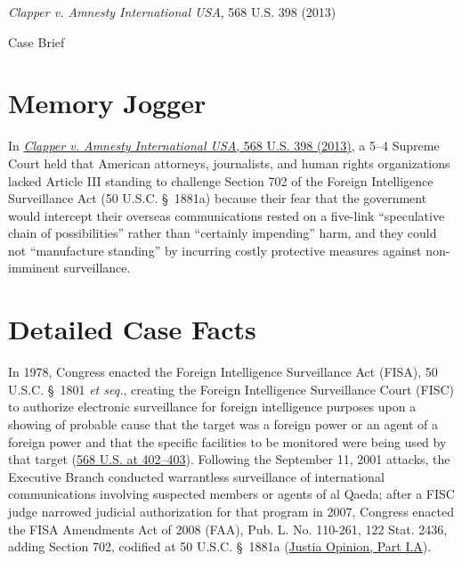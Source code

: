 \documentclass[12pt]{article}
\begin{document}
\begin{center}
{\LARGE \textit{Clapper v. Amnesty International USA}, 568 U.S. 398 (2013)\par}
\vspace{0.8em}
{\large Case Brief\par}
\end{center}
\vspace{1em}

\section{Memory Jogger}

In \href{https://supreme.justia.com/cases/federal/us/568/398/}{\textit{Clapper v. Amnesty International USA}, 568 U.S. 398 (2013)}, a 5--4 Supreme Court held that American attorneys, journalists, and human rights organizations lacked Article III standing to challenge Section 702 of the Foreign Intelligence Surveillance Act (50 U.S.C. \S~1881a) because their fear that the government would intercept their overseas communications rested on a five-link ``speculative chain of possibilities'' rather than ``certainly impending'' harm, and they could not ``manufacture standing'' by incurring costly protective measures against non-imminent surveillance.

\section{Detailed Case Facts}

In 1978, Congress enacted the Foreign Intelligence Surveillance Act (FISA), 50 U.S.C. \S~1801 \textit{et seq.}, creating the Foreign Intelligence Surveillance Court (FISC) to authorize electronic surveillance for foreign intelligence purposes upon a showing of probable cause that the target was a foreign power or an agent of a foreign power and that the specific facilities to be monitored were being used by that target (\href{https://tile.loc.gov/storage-services/service/ll/usrep/usrep568/usrep568398/usrep568398.pdf}{568 U.S. at 402--403}). Following the September 11, 2001 attacks, the Executive Branch conducted warrantless surveillance of international communications involving suspected members or agents of al Qaeda; after a FISC judge narrowed judicial authorization for that program in 2007, Congress enacted the FISA Amendments Act of 2008 (FAA), Pub. L. No. 110-261, 122 Stat. 2436, adding Section 702, codified at 50 U.S.C. \S~1881a (\href{https://supreme.justia.com/cases/federal/us/568/398/}{Justia Opinion, Part I.A}).
\end{document}
